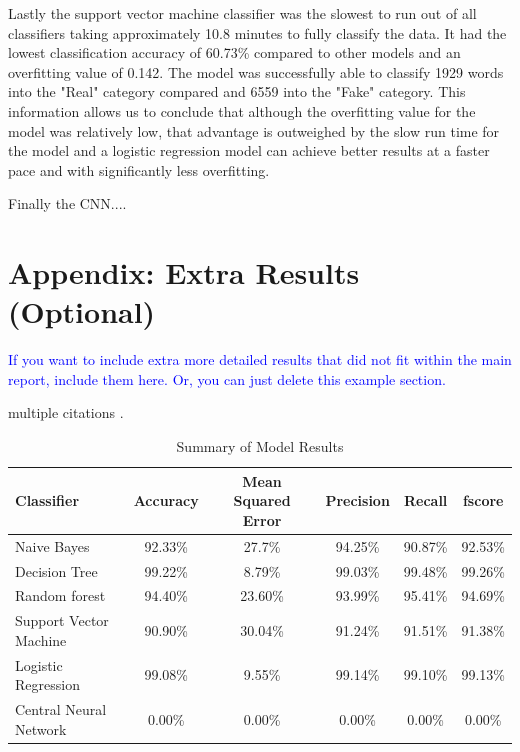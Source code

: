 \documentclass[10pt,twocolumn,letterpaper]{article}
\begin{document}
Lastly the support vector machine classifier was the slowest to run out of all classifiers taking approximately 10.8 minutes to fully classify the data. It had the lowest classification accuracy of 60.73\% compared to other models and an overfitting value of 0.142. The model was successfully able to classify 1929 words into the "Real" category compared and 6559 into the "Fake" category. This information allows us to conclude that although the overfitting value for the model was relatively low, that advantage is outweighed by the slow run time for the model and a logistic regression model can achieve better results at a faster pace and with significantly less overfitting. 

Finally the CNN.... 

{\small
\raggedright


}

\newpage
\appendix


\section*{Appendix: Extra Results (Optional)}

\textcolor{blue}{If you want to include extra more detailed results that did not fit within the main report, include them here. Or, you can just delete this example section.}

multiple citations \cite{breiman2001statistical,bishop2006pattern}.

\begin{table}[!hb]\centering
   \begin{center}
   \begin{tabular}{|l|c|c|c|c|c|}
   \hline
    Classifier & Accuracy & Mean Squared Error & Precision & Recall & fscore\\
   \hline\hline
   Naive Bayes & 92.33\% & 27.7\% & 94.25\% & 90.87\% & 92.53\% \\
   Decision Tree & 99.22\% & 8.79\% & 99.03\% & 99.48\% & 99.26\% \\
   Random forest & 94.40\% & 23.60\% & 93.99\% & 95.41\% & 94.69\%\\
   Support Vector Machine & 90.90\% & 30.04\% & 91.24\% & 91.51\% & 91.38\% \\
   Logistic Regression & 99.08\% & 9.55\% & 99.14\% & 99.10\% & 99.13\% \\
   Central Neural Network & 0.00\% & 0.00\% & 0.00\% & 0.00\% & 0.00\% \\
   \hline
   \end{tabular}
   \end{center}
   \caption{Summary of Model Results\label{first_table}}
\end{table}
\end{document}
